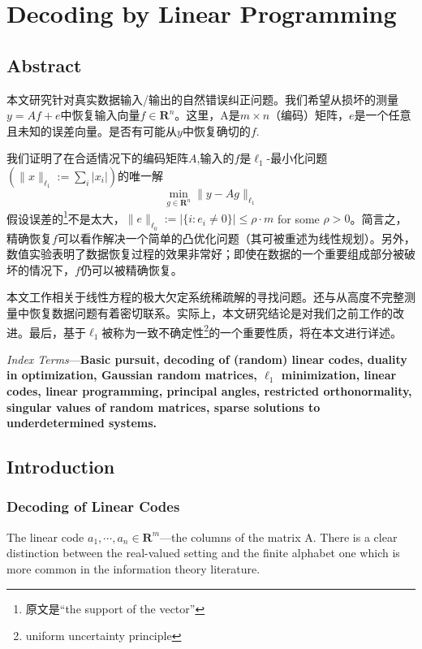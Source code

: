 \chapter{Decoding by Linear Programming}
\label{chapter5}
\section{Abstract}
本文研究针对真实数据输入/输出的自然错误纠正问题。我们希望从损坏的测量$y=Af+e$中恢复输入向量$f \in \mathbf{R}^n$。这里，A是$m \times n$（编码）矩阵，$e$是一个任意且未知的误差向量。是否有可能从$y$中恢复确切的$f$.

我们证明了在合适情况下的编码矩阵$A$,输入的$f$是$\ell_1$-最小化问题$(\|x\|_{\ell_1}:=\sum_i|x_i|)$的唯一解
\begin{equation*}
    \min\limits_{g \in \mathbf{R}^n} \|y-Ag\|_{\ell_1}
    \label{eqab5}
\end{equation*}
假设误差的\footnote{原文是``the support of the vector''}不是太大，$\|e\|_{\ell_0}:= |\{i:e_i \neq 0\}| \leq \rho \cdot m$ for some $\rho > 0$。简言之，精确恢复$f$可以看作解决一个简单的凸优化问题（其可被重述为线性规划）。另外，数值实验表明了数据恢复过程的效果非常好；即使在数据的一个重要组成部分被破坏的情况下，$f$仍可以被精确恢复。

本文工作相关于线性方程的极大欠定系统稀疏解的寻找问题。还与从高度不完整测量中恢复数据问题有着密切联系。实际上，本文研究结论是对我们之前工作的改进。最后，基于$\ell_1$被称为一致不确定性\footnote{uniform uncertainty principle}的一个重要性质，将在本文进行详述。

\emph{Index Terms}---\textbf{Basic pursuit, decoding of (random) linear codes, duality in optimization, Gaussian random matrices, $\ell_1$ minimization, linear codes, linear programming, principal angles, restricted orthonormality, singular values of random matrices, sparse solutions to underdetermined systems.}

\section{Introduction}
\subsection{Decoding of Linear Codes}
The linear code $a_1, \cdots, a_n \in \mathbf{R}^m$---the columns of the matrix A. There is a clear distinction between the real-valued setting and the finite alphabet one which is more common in the information theory literature.


